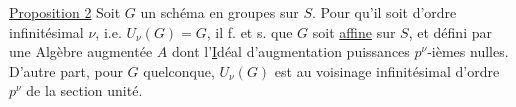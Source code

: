 \uline{Proposition 2} Soit $G$ un schéma en groupes sur $S$.
Pour qu'il soit d'ordre infinitésimal $\nu$, i.e.
$U_\nu(G)=G$, il f. et s. que $G$ soit \uline{affine} sur $S$, et défini
par une Algèbre augmentée $A$
dont l'\uline{I}déal d'augmentation 
 puissances $p^\nu$-ièmes nulles.
D'autre part, pour $G$ quelconque, $U_\nu(G)$ est
au voisinage infinitésimal d'ordre $p^\nu$ de la section unité.
